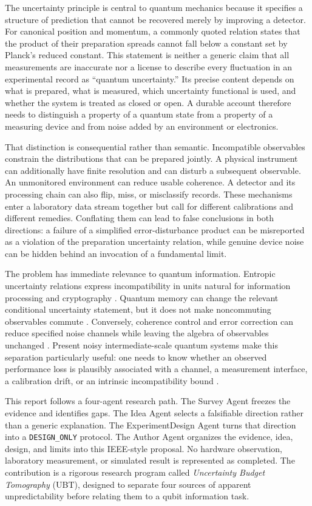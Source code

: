 \documentclass[conference]{../../../../Conference-LaTeX-template_10-17-19/IEEEtran}
\begin{document}
The uncertainty principle is central to quantum mechanics because it specifies a structure of prediction that cannot be recovered merely by improving a detector. For canonical position and momentum, a commonly quoted relation states that the product of their preparation spreads cannot fall below a constant set by Planck's reduced constant. This statement is neither a generic claim that all measurements are inaccurate nor a license to describe every fluctuation in an experimental record as ``quantum uncertainty.'' Its precise content depends on what is prepared, what is measured, which uncertainty functional is used, and whether the system is treated as closed or open. A durable account therefore needs to distinguish a property of a quantum state from a property of a measuring device and from noise added by an environment or electronics.

That distinction is consequential rather than semantic. Incompatible observables constrain the distributions that can be prepared jointly. A physical instrument can additionally have finite resolution and can disturb a subsequent observable. An unmonitored environment can reduce usable coherence. A detector and its processing chain can also flip, miss, or misclassify records. These mechanisms enter a laboratory data stream together but call for different calibrations and different remedies. Conflating them can lead to false conclusions in both directions: a failure of a simplified error-disturbance product can be misreported as a violation of the preparation uncertainty relation, while genuine device noise can be hidden behind an invocation of a fundamental limit.

The problem has immediate relevance to quantum information. Entropic uncertainty relations express incompatibility in units natural for information processing and cryptography \cite{coles2017}. Quantum memory can change the relevant conditional uncertainty statement, but it does not make noncommuting observables commute \cite{zhang2015}. Conversely, coherence control and error correction can reduce specified noise channels while leaving the algebra of observables unchanged \cite{steane1998,devitt2013}. Present noisy intermediate-scale quantum systems make this separation particularly useful: one needs to know whether an observed performance loss is plausibly associated with a channel, a measurement interface, a calibration drift, or an intrinsic incompatibility bound \cite{bharti2022}.

This report follows a four-agent research path. The Survey Agent freezes the evidence and identifies gaps. The Idea Agent selects a falsifiable direction rather than a generic explanation. The ExperimentDesign Agent turns that direction into a \texttt{DESIGN\_ONLY} protocol. The Author Agent organizes the evidence, idea, design, and limits into this IEEE-style proposal. No hardware observation, laboratory measurement, or simulated result is represented as completed. The contribution is a rigorous research program called \emph{Uncertainty Budget Tomography} (UBT), designed to separate four sources of apparent unpredictability before relating them to a qubit information task.
\end{document}
